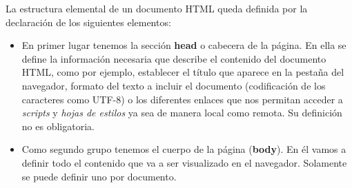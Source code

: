 \documentclass[../main.tex]{subfiles}
\begin{document}
    La estructura elemental de un documento HTML queda definida por la declaración de los siguientes elementos:

    \begin{itemize}
        \item En primer lugar tenemos la sección \textbf{head} o cabecera de la página. En ella se define la información necesaria que describe el contenido del documento HTML, como por ejemplo, establecer el título que aparece en la pestaña del navegador, formato del texto a incluir el documento (codificación de los caracteres como UTF-8) o los diferentes enlaces que nos permitan acceder a \textit{scripts} y \textit{hojas de estilos} ya sea de manera local como remota. Su definición no es obligatoria.
        
        \item Como segundo grupo tenemos el cuerpo de la página (\textbf{body}). En él vamos a definir todo el contenido que va a ser visualizado en el navegador. Solamente se puede definir uno por documento.
    
    \end{itemize}
    
\end{document}
